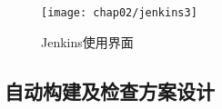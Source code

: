 \begin{figure}[H] %
  \centering
  \texttt{[image: chap02/jenkins3]}
  \caption{Jenkins使用界面}
  \label{fig:jenkins3}
\end{figure}
\subsection{自动构建及检查方案设计}

